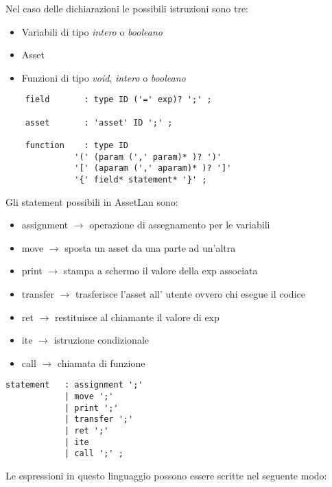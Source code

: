 \documentclass[12pt,twoside,openright,a4paper]{report}
\begin{document}
Nel caso delle dichiarazioni le possibili istruzioni sono tre:
\begin{itemize}
    \item Variabili di tipo \textit{intero} o \textit{booleano} 
    \item Asset
    \item Funzioni di tipo \textit{void}, \textit{intero} o \textit{booleano}
\end{itemize}

\begin{lstlisting}
    field       : type ID ('=' exp)? ';' ;

    asset       : 'asset' ID ';' ;

    function    : type ID
              '(' (param (',' param)* )? ')'
              '[' (aparam (',' aparam)* )? ']'
	          '{' field* statement* '}' ;
\end{lstlisting}

Gli statement possibili in AssetLan sono:
\begin{itemize}
    \item assignment \(\rightarrow\) operazione di assegnamento per le variabili
    \item move \(\rightarrow\) sposta un asset da una parte ad un'altra
    \item print \(\rightarrow\) stampa a schermo il valore della exp associata

    \item transfer \(\rightarrow\) trasferisce l'asset all' utente ovvero chi esegue il codice
    \item ret \(\rightarrow\) restituisce al chiamante il valore di exp
    \item ite \(\rightarrow\) istruzione condizionale
    \item call \(\rightarrow\) chiamata di funzione
\end{itemize}
\begin{lstlisting}
statement   : assignment ';'
            | move ';'     
            | print ';'
            | transfer ';' 
            | ret ';'
            | ite 
            | call ';' ;

\end{lstlisting}


Le espressioni in questo linguaggio possono essere scritte nel seguente modo:
\end{document}
